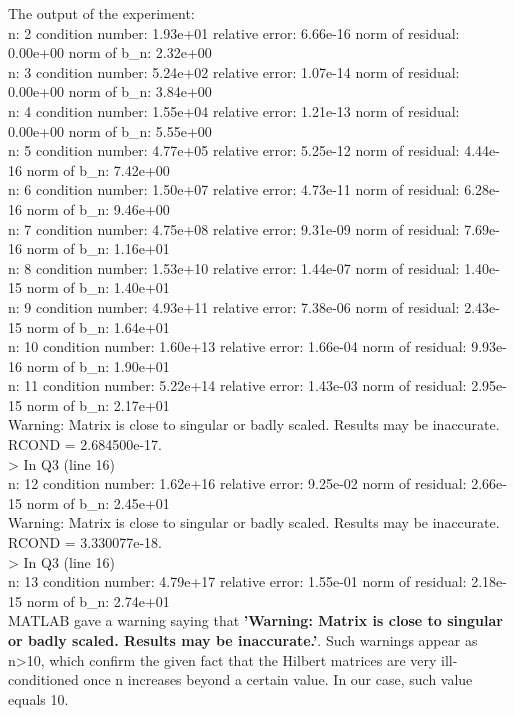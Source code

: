 \documentclass[12pt]{article}
\begin{document}
The output of the experiment:\\
n:  2 condition number:  1.93e+01 relative error:  6.66e-16 norm of residual:  0.00e+00 norm of b_n:  2.32e+00\\
n:  3 condition number:  5.24e+02 relative error:  1.07e-14 norm of residual:  0.00e+00 norm of b_n:  3.84e+00\\
n:  4 condition number:  1.55e+04 relative error:  1.21e-13 norm of residual:  0.00e+00 norm of b_n:  5.55e+00\\
n:  5 condition number:  4.77e+05 relative error:  5.25e-12 norm of residual:  4.44e-16 norm of b_n:  7.42e+00\\
n:  6 condition number:  1.50e+07 relative error:  4.73e-11 norm of residual:  6.28e-16 norm of b_n:  9.46e+00\\
n:  7 condition number:  4.75e+08 relative error:  9.31e-09 norm of residual:  7.69e-16 norm of b_n:  1.16e+01\\
n:  8 condition number:  1.53e+10 relative error:  1.44e-07 norm of residual:  1.40e-15 norm of b_n:  1.40e+01\\
n:  9 condition number:  4.93e+11 relative error:  7.38e-06 norm of residual:  2.43e-15 norm of b_n:  1.64e+01\\
n: 10 condition number:  1.60e+13 relative error:  1.66e-04 norm of residual:  9.93e-16 norm of b_n:  1.90e+01\\
n: 11 condition number:  5.22e+14 relative error:  1.43e-03 norm of residual:  2.95e-15 norm of b_n:  2.17e+01\\
Warning: Matrix is close to singular or badly scaled. Results may be inaccurate. RCOND =  2.684500e-17. \\
> In Q3 (line 16)\\
 
n: 12 condition number:  1.62e+16 relative error:  9.25e-02 norm of residual:  2.66e-15 norm of b_n:  2.45e+01\\
Warning: Matrix is close to singular or badly scaled. Results may be inaccurate. RCOND =  3.330077e-18. \\
> In Q3 (line 16)\\
 
n: 13 condition number:  4.79e+17 relative error:  1.55e-01 norm of residual:  2.18e-15 norm of b_n:  2.74e+01\\

MATLAB gave a warning saying that \textbf{'Warning: Matrix is close to singular or badly scaled. Results may be inaccurate.'}. Such warnings appear as n>10, which confirm the given fact that the Hilbert matrices are very ill-conditioned once n increases beyond a certain value. In our case, such value equals 10.
\end{document}
